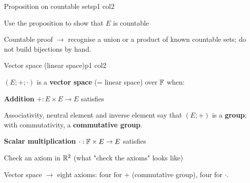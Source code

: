 \documentclass[sheet,noautoquant,noautokw]{neyvia-study}
\begin{document}
\begin{concept}[1.10]{Proposition on countable sets}{p1 col2}
\begin{definition}
\end{definition}
\begin{method}{Use the proposition to show that $E$ is countable}
\end{method}
\begin{reflex}
Countable proof \ensuremath{\rightarrow} recognise a union or a product of known countable sets; do not build bijections by hand.
\end{reflex}
\end{concept}
\begin{concept}[1.11]{Vector space (linear space)}{p1 col2}
\begin{definition}
\noindent $(E;+;\cdot)$ is a \textbf{vector space} (= linear space) over $\mathbb{F}$ when:
\par\noindent \textbf{Addition} $+:E\times E\to E$ satisfies
\par\noindent Associativity, neutral element and inverse element say that $(E;+)$ is a \textbf{group}; with commutativity, a \textbf{commutative group}.
\par\noindent \textbf{Scalar multiplication} $\cdot:\mathbb{F}\times E\to E$ satisfies
\end{definition}
\begin{method}{Check an axiom in $\mathbb{R}^2$ (what "check the axioms" looks like)}
\end{method}
\begin{reflex}
Vector space \ensuremath{\rightarrow} eight axioms: four for $+$ (commutative group), four for $\cdot$.
\end{reflex}
\end{concept}
\end{document}
